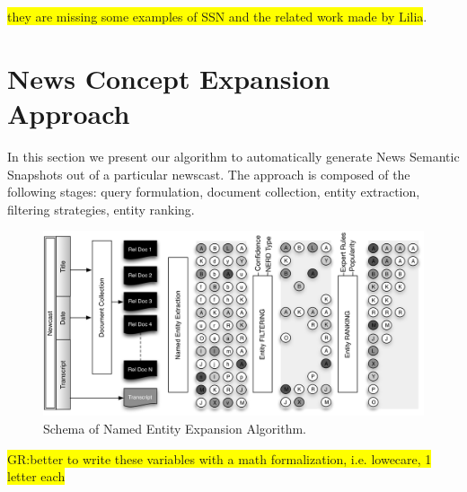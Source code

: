 \documentclass{llncs}
\newcommand{\hg}[1]{\colorbox{yellow}{#1}}
\begin{document}
\hg{they are missing some examples of SSN and the related work made by Lilia}.

\section{News Concept Expansion Approach}
\label{sec:ConceptExpansion}

In this section we present our algorithm to automatically generate News Semantic Snapshots out of a particular newscast. The approach is composed of the following stages: query formulation, document collection, entity extraction, filtering strategies, entity ranking.

\begin{figure}[h!]
\centering
\includegraphics[width=1\textwidth]{figure/ExpansionDiagram}
\caption{Schema of Named Entity Expansion Algorithm.}
\label{fig:namedEntityExpansion}%
\end{figure}

\hg{GR:better to write these variables with a math formalization, i.e. lowecare, 1 letter each}
\end{document}
